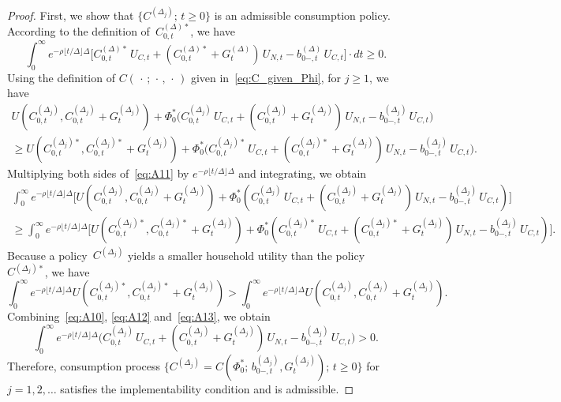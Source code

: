 \documentclass[12pt]{article}
\begin{document}
{{{\begin{proof}
First, we show that $\{C^{(\Delta_j)};\, t \ge 0\}$ is an admissible consumption policy. According to the definition of~$C_{0,t}^{(\Delta)*}$, we have
\begin{equation}\label{eq:A10}
\int_0^\infty e^{-\rho \lfloor t/\Delta \rfloor \Delta}\bigl[C_{0,t}^{(\Delta)*}\, U_{C,t} + (C_{0,t}^{(\Delta)*}+G_t^{(\Delta)})\, U_{N,t} - b_{0-,t}^{(\Delta)}\, U_{C,t}\bigr] \cdot dt \ge 0.
\end{equation}
Using the definition of $C(\,\cdot\,;\, \cdot\,,\, \cdot\,)$ given in~\eqref{eq:C_given_Phi}, for $j \ge 1$, we have
\begin{multline}\label{eq:A11}
U(C_{0,t}^{(\Delta_j)}, C_{0,t}^{(\Delta_j)}+G_t^{(\Delta_j)}) + \Phi_0^*\bigl(C_{0,t}^{(\Delta_j)}\, U_{C,t} + (C_{0,t}^{(\Delta_j)}+G_t^{(\Delta_j)})\, U_{N,t} - b_{0-,t}^{(\Delta_j)}\, U_{C,t}\bigr) \\
\ge U(C_{0,t}^{(\Delta_j)*}, C_{0,t}^{(\Delta_j)*}+G_t^{(\Delta_j)}) + \Phi_0^*\bigl(C_{0,t}^{(\Delta_j)*}\, U_{C,t} + (C_{0,t}^{(\Delta_j)*}+G_t^{(\Delta_j)})\, U_{N,t} - b_{0-,t}^{(\Delta_j)}\, U_{C,t}\bigr).
\end{multline}
Multiplying both sides of~\eqref{eq:A11} by $e^{-\rho \lfloor t/\Delta \rfloor \Delta}$ and integrating, we obtain
\begin{multline}\label{eq:A12}
\int_0^\infty e^{-\rho \lfloor t/\Delta \rfloor \Delta}\bigl[U(C_{0,t}^{(\Delta_j)}, C_{0,t}^{(\Delta_j)}+G_t^{(\Delta_j)}) + \Phi_0^*(C_{0,t}^{(\Delta_j)}\, U_{C,t} + (C_{0,t}^{(\Delta_j)}+G_t^{(\Delta_j)})\, U_{N,t} - b_{0-,t}^{(\Delta_j)}\, U_{C,t})\bigr] \\
\ge \int_0^\infty e^{-\rho \lfloor t/\Delta \rfloor \Delta}\bigl[U(C_{0,t}^{(\Delta_j)*}, C_{0,t}^{(\Delta_j)*}+G_t^{(\Delta_j)}) + \Phi_0^*(C_{0,t}^{(\Delta_j)*}\, U_{C,t} + (C_{0,t}^{(\Delta_j)*}+G_t^{(\Delta_j)})\, U_{N,t} - b_{0-,t}^{(\Delta_j)}\, U_{C,t})\bigr].
\end{multline}
Because a policy~$C^{(\Delta_j)}$ yields a smaller household utility than the policy~$C^{(\Delta_j)*}$, we have
\begin{equation}\label{eq:A13}
\int_0^\infty e^{-\rho \lfloor t/\Delta \rfloor \Delta} U(C_{0,t}^{(\Delta_j)*}, C_{0,t}^{(\Delta_j)*}+G_t^{(\Delta_j)}) > \int_0^\infty e^{-\rho \lfloor t/\Delta \rfloor \Delta} U(C_{0,t}^{(\Delta_j)}, C_{0,t}^{(\Delta_j)}+G_t^{(\Delta_j)}).
\end{equation}
Combining~\eqref{eq:A10}, \eqref{eq:A12} and~\eqref{eq:A13}, we obtain
\begin{equation}\label{eq:A14}
\int_0^\infty e^{-\rho \lfloor t/\Delta \rfloor \Delta}\bigl(C_{0,t}^{(\Delta_j)}\, U_{C,t} + (C_{0,t}^{(\Delta_j)}+G_t^{(\Delta_j)})\, U_{N,t} - b_{0-,t}^{(\Delta_j)}\, U_{C,t}\bigr) > 0.
\end{equation}
Therefore, consumption process $\{C^{(\Delta_j)} = C(\Phi_0^*;\, b_{0-,t}^{(\Delta_j)}, G_t^{(\Delta_j)});\, t \ge 0\}$ for $j = 1, 2, \ldots$ satisfies the implementability condition and is admissible.


\end{proof}}}}
\end{document}
